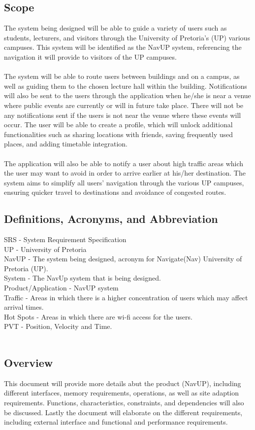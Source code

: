 \documentclass{article}
\begin{document}
\subsection{Scope}
The system being designed will be able to guide a variety of users such as students, lecturers, and visitors through the University of Pretoria's (UP) various campuses. This system will be identified as the NavUP system, referencing the navigation it will provide to visitors of the UP campuses.\\\\
The system will be able to route users between buildings and on a campus, as well as guiding them to the chosen lecture hall within the building. Notifications will also be sent to the users through the application when he/she is near a venue where public events are currently or will in future take place. There will not be any notifications sent if the users is not near the venue where these events will occur. The user will be able to create a profile, which will unlock additional functionalities such as sharing locations with friends, saving frequently used places, and adding timetable integration.\\\\
The application will also be able to notify a user about high traffic areas which the user may want to avoid in order to arrive earlier at his/her destination. The system aims to simplify all users' navigation through the various UP campuses, ensuring quicker travel to destinations and avoidance of congested routes.
\subsection{Definitions, Acronyms, and Abbreviation}
SRS - System Requirement Specification\\
UP - University of Pretoria\\
NavUP - The system being designed, acronym for Navigate(Nav) University of Pretoria (UP).\\
System - The NavUp system that is being designed.\\
Product/Application - NavUP system\\
Traffic - Areas in which there is a higher concentration of users which may affect arrival times.\\
Hot Spots - Areas in which there are wi-fi access for the users.\\
PVT - Position, Velocity and Time.\\\\
\subsection{Overview}
This document will provide more details abut the product (NavUP), including different interfaces, memory requirements, operations, as well as site adaption requirements. Functions, characteristics, constraints, and dependencies will also be discussed. Lastly the document will elaborate on  the different requirements, including external interface and functional and performance requirements.
\end{document}

